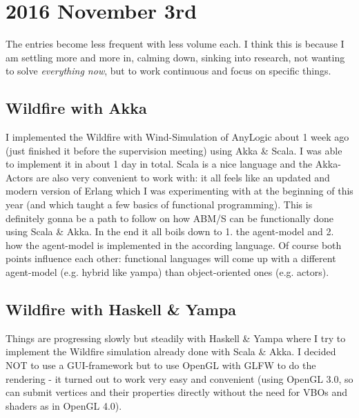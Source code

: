 \section*{2016 November 3rd}
The entries become less frequent with less volume each. I think this is because I am settling more and more in, calming down, sinking into research, not wanting to solve \textit{everything now}, but to work continuous and focus on specific things.

\subsection*{Wildfire with Akka}
I implemented the Wildfire with Wind-Simulation of AnyLogic about 1 week ago (just finished it before the supervision meeting) using Akka \& Scala. I was able to implement it in about 1 day in total. Scala is a nice language and the Akka-Actors are also very convenient to work with: it all feels like an updated and modern version of Erlang which I was experimenting with at the beginning of this year (and which taught a few basics of functional programming). This is definitely gonna be a path to follow on how ABM/S can be functionally done using Scala \& Akka. In the end it all boils down to 1. the agent-model and 2. how the agent-model is implemented in the according language. Of course both points influence each other: functional languages will come up with a different agent-model (e.g. hybrid like yampa) than object-oriented ones (e.g. actors).

\subsection*{Wildfire with Haskell \& Yampa}
Things are progressing slowly but steadily with Haskell \& Yampa where I try to implement the Wildfire simulation already done with Scala \& Akka. I decided NOT to use a GUI-framework but to use OpenGL with GLFW to do the rendering - it turned out to work very easy and convenient (using OpenGL 3.0, so can submit vertices and their properties directly without the need for VBOs and shaders as in OpenGL 4.0). 
